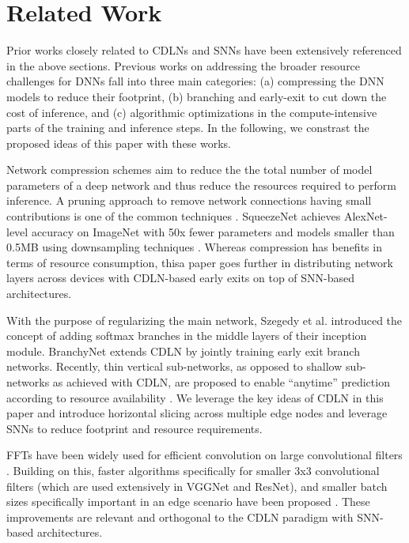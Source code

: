 \section{Related Work}
\label{sec:related}
Prior works closely related to CDLNs and SNNs have been extensively
referenced in the above sections. Previous works on addressing the
broader resource challenges for DNNs fall into three main categories:
(a) compressing the DNN models to reduce their footprint, (b)
branching and early-exit to cut down the cost of inference, and (c)
algorithmic optimizations in the compute-intensive parts of the
training and inference steps.  In the following, we constrast the
proposed ideas of this paper with these works.

 Network compression schemes aim to reduce
the the total number of model parameters of a deep network and thus
reduce the resources required to perform inference. A pruning approach
to remove network connections having small contributions is one of the
common techniques \cite{Han-DeepCC-2015}. SqueezeNet achieves
AlexNet-level accuracy on ImageNet with 50x fewer parameters and
models smaller than 0.5MB using downsampling techniques
\cite{SqueezeNet-2016}. Whereas compression has benefits in terms of
resource consumption, thisa paper goes further in distributing network
layers across devices with CDLN-based early exits on top of SNN-based
architectures.

 With the purpose of regularizing the main
network, Szegedy et al. \cite{Szegedy-regluar-2015} introduced the
concept of adding softmax branches in the middle layers of their
inception module. BranchyNet \cite{BranchyNet-2016} extends CDLN by
jointly training early exit branch networks. Recently, thin vertical
sub-networks, as opposed to shallow sub-networks as achieved with
CDLN, are proposed to enable ``anytime'' prediction according to
resource availability \cite{Lee-Anytime-2018}.  We leverage the key
ideas of CDLN in this paper and introduce horizontal slicing across
multiple edge nodes and leverage SNNs to reduce footprint and resource
requirements.

 FFTs have been widely used for
efficient convolution on large convolutional filters
\cite{Mathieu-Fast-2014}. Building on this, faster algorithms
specifically for smaller 3x3 convolutional filters (which are used
extensively in VGGNet and ResNet), and smaller batch sizes
specifically important in an edge scenario have been proposed
\cite{Lavin-Fast-2016}. These improvements are relevant and orthogonal
to the CDLN paradigm with SNN-based architectures.

